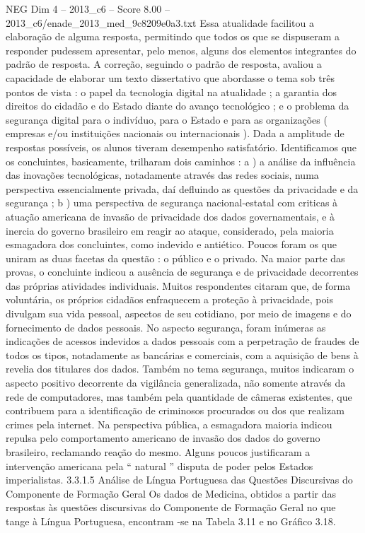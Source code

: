 \begin{textsample}{NEG Dim 4 – 2013\_c6 – Score 8.00 – 2013\_c6/enade\_2013\_med\_9c8209e0a3.txt}
Essa atualidade facilitou a elaboração de alguma resposta, permitindo que todos os que se dispuseram a responder pudessem apresentar, pelo menos, alguns dos elementos integrantes do padrão de resposta.
A correção, seguindo o padrão de resposta, avaliou a capacidade de elaborar um texto dissertativo que abordasse o tema sob três pontos de vista : o papel da tecnologia digital na atualidade ; a garantia dos direitos do cidadão e do Estado diante do avanço tecnológico ; e o problema da segurança digital para o indivíduo, para o Estado e para as organizações ( empresas e/ou instituições nacionais ou internacionais ).
Dada a amplitude de respostas possíveis, os alunos tiveram desempenho satisfatório.
Identificamos que os concluintes, basicamente, trilharam dois caminhos : a ) a análise da influência das inovações tecnológicas, notadamente através das redes sociais, numa perspectiva essencialmente privada, daí defluindo as questões da privacidade e da segurança ; b ) uma perspectiva de segurança nacional-estatal com criticas à atuação americana de invasão de privacidade dos dados governamentais, e à inercia do governo brasileiro em reagir ao ataque, considerado, pela maioria esmagadora dos concluintes, como indevido e antiético.
Poucos foram os que uniram as duas facetas da questão : o público e o privado.
Na maior parte das provas, o concluinte indicou a ausência de segurança e de privacidade decorrentes das próprias atividades individuais.
Muitos respondentes citaram que, de forma voluntária, os próprios cidadãos enfraquecem a proteção à privacidade, pois divulgam sua vida pessoal, aspectos de seu cotidiano, por meio de imagens e do fornecimento de dados pessoais.
No aspecto segurança, foram inúmeras as indicações de acessos indevidos a dados pessoais com a perpetração de fraudes de todos os tipos, notadamente as bancárias e comerciais, com a aquisição de bens à revelia dos titulares dos dados.
Também no tema segurança, muitos indicaram o aspecto positivo decorrente da vigilância generalizada, não somente através da rede de computadores, mas também pela quantidade de câmeras existentes, que contribuem para a identificação de criminosos procurados ou dos que realizam crimes pela internet.
Na perspectiva pública, a esmagadora maioria indicou repulsa pelo comportamento americano de invasão dos dados do governo brasileiro, reclamando reação do mesmo.
Alguns poucos justificaram a intervenção americana pela “ natural ” disputa de poder pelos Estados imperialistas. 3.3.1.5 Análise de Língua Portuguesa das Questões Discursivas do Componente de Formação Geral Os dados de Medicina, obtidos a partir das respostas às questões discursivas do Componente de Formação Geral no que tange à Língua Portuguesa, encontram -se na Tabela 3.11 e no Gráfico 3.18.

\end{textsample}
